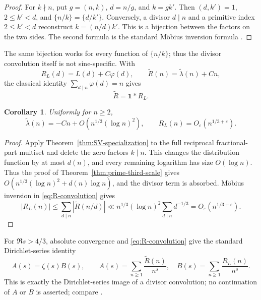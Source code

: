 \documentclass[11pt]{amsart}
\numberwithin{equation}{section}
\newtheorem{corollary}[theorem]{Corollary}
\theoremstyle{definition}
\theoremstyle{remark}
\newcommand{\eps}{\varepsilon}
\begin{document}
\begin{proof}
For \(k\nmid n\), put \(g=(n,k)\), \(d=n/g\), and \(k=gk'\).
Then \((d,k')=1\), \(2\leq k'<d\), and
\(\{n/k\}=\{d/k'\}\).  Conversely, a divisor \(d\mid n\) and a
primitive index \(2\leq k'<d\) reconstruct \(k=(n/d)k'\).  This is a
bijection between the factors on the two sides.  The second formula is the
standard M\"obius inversion formula \cite[Chapter~2]{Apostol1976}.
\end{proof}

The same bijection works for every function of \(\{n/k\}\); thus the
divisor convolution itself is not sine-specific.  With
\begin{equation}\label{eq:RL-def}
 R_L(d)=L(d)+C\varphi(d),
 \qquad \widetilde R(n)=\widetilde\lambda(n)+Cn,
\end{equation}
the classical identity \(\sum_{d\mid n}\varphi(d)=n\) gives
\begin{equation}\label{eq:R-convolution}
 \widetilde R=\mathbf1*R_L.
\end{equation}

\begin{corollary}\label{cor:tilde-scale}
Uniformly for \(n\geq2\),
\begin{equation}\label{eq:tilde-scale}
 \widetilde\lambda(n)=-Cn+O\!\left(n^{1/3}(\log n)^2\right),
 \qquad R_L(n)=O_\eps(n^{1/3+\eps}).
\end{equation}
\end{corollary}

\begin{proof}
Apply Theorem~\ref{thm:SV-specialization} to the full reciprocal
fractional-part multiset and delete the zero factors \(k\mid n\).  This
changes the distribution function by at most \(d(n)\), and every remaining
logarithm has size \(O(\log n)\).  Thus the proof of
Theorem~\ref{thm:prime-third-scale} gives
\(O(n^{1/3}(\log n)^2+d(n)\log n)\), and the divisor term is absorbed.
M\"obius inversion in \eqref{eq:R-convolution} gives
\[
 |R_L(n)|\le\sum_{d\mid n}|\widetilde R(n/d)|
 \ll n^{1/3}(\log n)^2\sum_{d\mid n}d^{-1/3}
 =O_\eps(n^{1/3+\eps}).
\]
\end{proof}

For \(\Re s>4/3\), absolute convergence and
\eqref{eq:R-convolution} give the standard Dirichlet-series identity
\begin{equation}\label{eq:AB}
 A(s)=\zeta(s)B(s),
 \qquad
 A(s)=\sum_{n\geq1}\frac{\widetilde R(n)}{n^s},
 \quad B(s)=\sum_{n\geq1}\frac{R_L(n)}{n^s}.
\end{equation}
This is exactly the Dirichlet-series image of a divisor convolution; no
continuation of \(A\) or \(B\) is asserted; compare
\cite[Chapter~2]{Apostol1976}.
\end{document}
